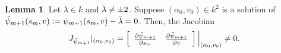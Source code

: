 \documentclass[10pt,twoside]{amsart}
\theoremstyle{definition}
\theoremstyle{definition}
\newtheorem{lemma}[theorem]{Lemma}
\begin{document}
\begin{lemma}{\label{jacobian1}}
Let $\bar\lambda\in k$ and $\Bar{\lambda}\neq \pm 2$. Suppose $(\alpha_0, v_0)\in k^2$ is a solution of $\Tilde{\psi}_{m+1}(s_m, v):=\psi_{m+1}(s_m, v)- \bar \lambda =0$.  
Then, the Jacobian $$J_{\Tilde{\psi}_{m+1}}|_{(\alpha_0,v_0)}=\left[\begin{array}{ccc} \frac{\partial\Tilde{\psi}_{m+1}}{\partial s_m} & \frac{\partial\Tilde{\psi}_{m+1}}{\partial v}  \end{array}\right]\Big |_{(\alpha_0,v_0)}\neq 0.$$
\end{lemma}
\end{document}
